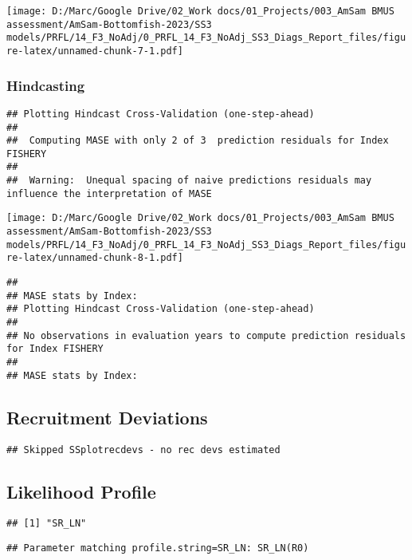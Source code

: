\documentclass[
]{article}
\begin{document}
\texttt{[image: D:/Marc/Google Drive/02\_Work docs/01\_Projects/003\_AmSam BMUS assessment/AmSam-Bottomfish-2023/SS3 models/PRFL/14\_F3\_NoAdj/0\_PRFL\_14\_F3\_NoAdj\_SS3\_Diags\_Report\_files/figure-latex/unnamed-chunk-7-1.pdf]}

\hypertarget{hindcasting}{%
\subsubsection{Hindcasting}\label{hindcasting}}

\begin{verbatim}
## Plotting Hindcast Cross-Validation (one-step-ahead) 
## 
##  Computing MASE with only 2 of 3  prediction residuals for Index FISHERY 
## 
##  Warning:  Unequal spacing of naive predictions residuals may influence the interpretation of MASE
\end{verbatim}

\texttt{[image: D:/Marc/Google Drive/02\_Work docs/01\_Projects/003\_AmSam BMUS assessment/AmSam-Bottomfish-2023/SS3 models/PRFL/14\_F3\_NoAdj/0\_PRFL\_14\_F3\_NoAdj\_SS3\_Diags\_Report\_files/figure-latex/unnamed-chunk-8-1.pdf]}

\begin{verbatim}
## 
## MASE stats by Index:
## Plotting Hindcast Cross-Validation (one-step-ahead) 
## 
## No observations in evaluation years to compute prediction residuals for Index FISHERY 
## 
## MASE stats by Index:
\end{verbatim}

\hypertarget{recruitment-deviations}{%
\subsection{Recruitment Deviations}\label{recruitment-deviations}}

\begin{verbatim}
## Skipped SSplotrecdevs - no rec devs estimated
\end{verbatim}

\hypertarget{likelihood-profile}{%
\subsection{Likelihood Profile}\label{likelihood-profile}}

\begin{verbatim}
## [1] "SR_LN"
\end{verbatim}

\begin{verbatim}
## Parameter matching profile.string=SR_LN: SR_LN(R0)
\end{verbatim}
\end{document}
